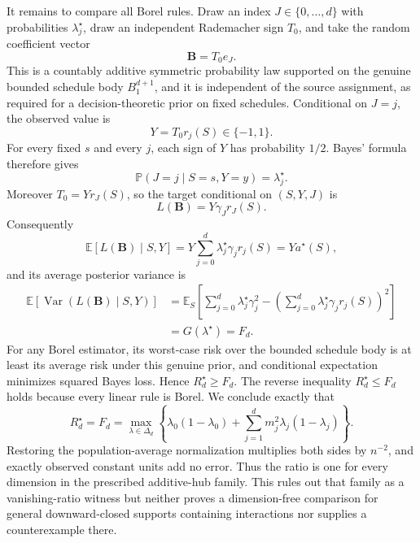 It remains to compare all Borel rules.  Draw an index \(J\in\{0,\ldots,d\}\) with probabilities \(\lambda_j^{\star}\), draw an independent Rademacher sign \(T_0\), and take the random coefficient vector
\[
 \mathbf B=T_0e_J.
\]
This is a countably additive symmetric probability law supported on the genuine bounded schedule body \(B_1^{d+1}\), and it is independent of the source assignment, as required for a decision-theoretic prior on fixed schedules.  Conditional on \(J=j\), the observed value is
\[
 Y=T_0r_j(S)\in\{-1,1\}.
\]
For every fixed \(s\) and every \(j\), each sign of \(Y\) has probability \(1/2\).  Bayes' formula therefore gives
\[
 \mathbb P(J=j\mid S=s,Y=y)=\lambda_j^{\star}.
\]
Moreover \(T_0=Yr_J(S)\), so the target conditional on \((S,Y,J)\) is
\[
 L(\mathbf B)=Y\gamma_Jr_J(S).
\]
Consequently
\[
 \mathbb E[L(\mathbf B)\mid S,Y]
 =Y\sum_{j=0}^d\lambda_j^{\star}\gamma_jr_j(S)
 =Ya^{\star}(S),
\]
and its average posterior variance is
\[
 \begin{aligned}
 \mathbb E\!\left[\operatorname{Var}
       (L(\mathbf B)\mid S,Y)\right]
 &=\mathbb E_S\!\left[
      \sum_{j=0}^d\lambda_j^{\star}\gamma_j^2-
      \left(\sum_{j=0}^d\lambda_j^{\star}\gamma_jr_j(S)\right)^2
    \right]\\
 &=G(\lambda^{\star})=F_d.
 \end{aligned}
\]
For any Borel estimator, its worst-case risk over the bounded schedule body is at least its average risk under this genuine prior, and conditional expectation minimizes squared Bayes loss.  Hence \(R_d^{\star}\ge F_d\).  The reverse inequality \(R_d^{\star}\le F_d\) holds because every linear rule is Borel.  We conclude exactly that
\[
 R_d^{\star}=F_d
 =\max_{\lambda\in\Delta_d}
 \left\{\lambda_0(1-\lambda_0)
 +\sum_{j=1}^dm_j^2\lambda_j(1-\lambda_j)\right\}.
\]
Restoring the population-average normalization multiplies both sides by \(n^{-2}\), and exactly observed constant units add no error.  Thus the ratio is one for every dimension in the prescribed additive-hub family.  This rules out that family as a vanishing-ratio witness but neither proves a dimension-free comparison for general downward-closed supports containing interactions nor supplies a counterexample there.